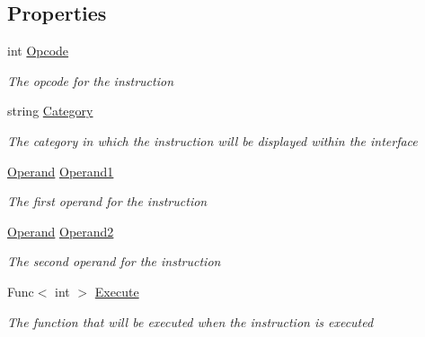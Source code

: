 \subsection*{Properties}
\begin{DoxyCompactItemize}
\item 
int \hyperlink{class_c_p_u___o_s___simulator_1_1_c_p_u_1_1_instruction_af56668feff9c8dab3c9335969a25e074}{Opcode}
\begin{DoxyCompactList}\small\item\em The opcode for the instruction \end{DoxyCompactList}\item 
string \hyperlink{class_c_p_u___o_s___simulator_1_1_c_p_u_1_1_instruction_a7b7c3068cebbf81c64b67496b20c733a}{Category}
\begin{DoxyCompactList}\small\item\em The category in which the instruction will be displayed within the interface \end{DoxyCompactList}\item 
\hyperlink{class_c_p_u___o_s___simulator_1_1_c_p_u_1_1_operand}{Operand} \hyperlink{class_c_p_u___o_s___simulator_1_1_c_p_u_1_1_instruction_a5eaf08ac611da1175f38f93defdee8d5}{Operand1}
\begin{DoxyCompactList}\small\item\em The first operand for the instruction \end{DoxyCompactList}\item 
\hyperlink{class_c_p_u___o_s___simulator_1_1_c_p_u_1_1_operand}{Operand} \hyperlink{class_c_p_u___o_s___simulator_1_1_c_p_u_1_1_instruction_ab35e6667e7c2f42dd09965995e25ff2d}{Operand2}
\begin{DoxyCompactList}\small\item\em The second operand for the instruction \end{DoxyCompactList}\item 
Func$<$ int $>$ \hyperlink{class_c_p_u___o_s___simulator_1_1_c_p_u_1_1_instruction_afc4c52737c07181195a29413cf09d2a5}{Execute}
\begin{DoxyCompactList}\small\item\em The function that will be executed when the instruction is executed \end{DoxyCompactList}\item 

\end{DoxyCompactItemize}
